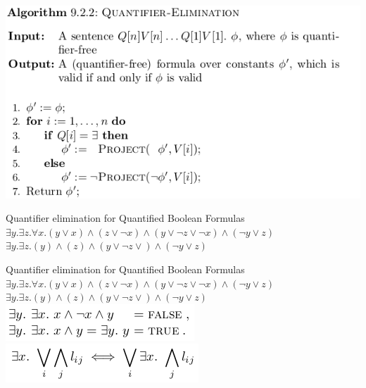 \documentclass{beamer}
\begin{document}
\begin{frame}
\includegraphics[scale=0.5]{quantifier-elimination.png}\newline
\end{frame}

\begin{frame}{Quantifier elimination for Quantified Boolean Formulas}
$\exists y.\exists z.\forall x.(y\vee x)\wedge(z\vee\lnot x) \wedge (y \vee \lnot z \vee \lnot x) \wedge (\lnot y \vee z)$\newline
$\exists y.\exists z.(y)\wedge(z) \wedge (y \vee \lnot z\vee) \wedge (\lnot y \vee z)$\newline
\end{frame}

\begin{frame}{Quantifier elimination for Quantified Boolean Formulas}
$\exists y.\exists z.\forall x.(y\vee x)\wedge(z\vee\lnot x) \wedge (y \vee \lnot z \vee \lnot x) \wedge (\lnot y \vee z)$\newline
$\exists y.\exists z.(y)\wedge(z) \wedge (y \vee \lnot z\vee) \wedge (\lnot y \vee z)$\newline
\includegraphics[scale=0.5]{elem_qbf1.png}\newline
\includegraphics[scale=0.5]{elem_qbf2.png}\newline
\end{frame}
\end{document}
